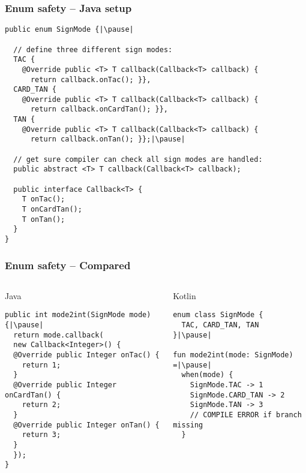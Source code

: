 
\begin{frame}[fragile] \frametitle{Enum safety -- Java setup}
\pause
\begin{lstlisting}[basicstyle=\color{IJ_text}\ttfamily\tiny]
public enum SignMode {|\pause|

  // define three different sign modes:
  TAC {
    @Override public <T> T callback(Callback<T> callback) {
      return callback.onTac(); }},
  CARD_TAN {
    @Override public <T> T callback(Callback<T> callback) {
      return callback.onCardTan(); }},
  TAN {
    @Override public <T> T callback(Callback<T> callback) {
      return callback.onTan(); }};|\pause|

  // get sure compiler can check all sign modes are handled:
  public abstract <T> T callback(Callback<T> callback);

  public interface Callback<T> {
    T onTac();
    T onCardTan();
    T onTan();
  }
}

\end{lstlisting}
\end{frame}

\begin{frame}[fragile]
\frametitle{Enum safety -- Compared}
\pause
\begin{columns}[t]
\begin{column}{0.5\textwidth}
\begin{center}
  Java
\end{center}
\begin{lstlisting}[style=twosided]
public int mode2int(SignMode mode) {|\pause|
  return mode.callback(
  new Callback<Integer>() {
  @Override public Integer onTac() {
    return 1;
  }
  @Override public Integer onCardTan() {
    return 2;
  }
  @Override public Integer onTan() {
    return 3;
  }
  });
}
\end{lstlisting}
\end{column}
\pause
\begin{column}{0.5\textwidth}
\begin{center}
  Kotlin
\end{center}
\begin{lstlisting}[style=twosided]
enum class SignMode {
  TAC, CARD_TAN, TAN
}|\pause|

fun mode2int(mode: SignMode) =|\pause|
  when(mode) {
    SignMode.TAC -> 1
    SignMode.CARD_TAN -> 2
    SignMode.TAN -> 3
    // COMPILE ERROR if branch missing
  }
\end{lstlisting}
\end{column}
\end{columns}
\end{frame}



